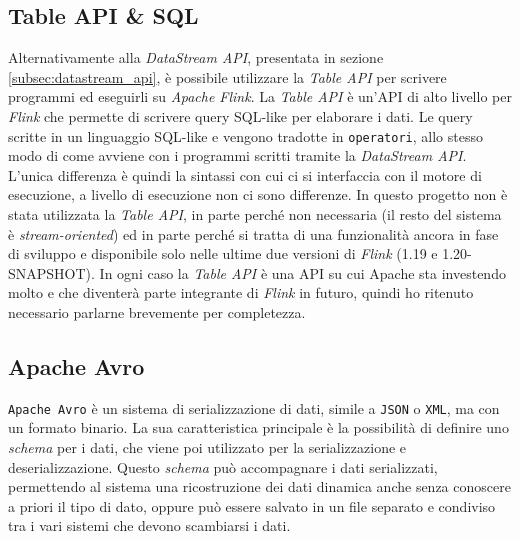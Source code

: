 \subsection{Table API \& SQL}
\label{subsec:flink_table_api}
Alternativamente alla \textit{DataStream API}, presentata in sezione \ref{subsec:datastream_api}, è possibile utilizzare la \textit{Table API}
 per scrivere programmi ed eseguirli su \textit{Apache Flink}.
La \textit{Table API} è un'API di alto livello per \textit{Flink} che permette di scrivere query SQL-like per elaborare i dati.
Le query scritte in un linguaggio SQL-like e vengono tradotte in \texttt{operatori}, 
allo stesso modo di come avviene con i programmi scritti tramite la \textit{DataStream API}.
L'unica differenza è quindi la sintassi con cui ci si interfaccia con il motore di esecuzione, a livello di esecuzione non ci sono differenze.
In questo progetto non è stata utilizzata la \textit{Table API}, in parte perché non necessaria (il resto del sistema è \textit{stream-oriented}) ed in parte
perché si tratta di una funzionalità ancora in fase di sviluppo e disponibile solo nelle ultime due versioni di \textit{Flink} (1.19 e 1.20-SNAPSHOT).
In ogni caso la \textit{Table API} è una API su cui Apache sta investendo molto e che diventerà parte integrante di \textit{Flink} in futuro, quindi 
ho ritenuto necessario parlarne brevemente per completezza.

\subsection{Apache Avro}
\label{subsec:avro_overview}
\texttt{Apache Avro} è un sistema di serializzazione di dati, simile a \texttt{JSON} o \texttt{XML}, ma con un formato binario.
La sua caratteristica principale è la possibilità di definire uno \textit{schema} per i dati, che viene poi utilizzato per la serializzazione e deserializzazione.
Questo \textit{schema} può accompagnare i dati serializzati, permettendo al sistema una ricostruzione dei dati dinamica anche senza conoscere a priori il tipo di dato,
oppure può essere salvato in un file separato e condiviso tra i vari sistemi che devono scambiarsi i dati.\\\\

